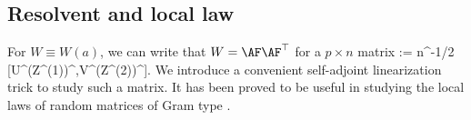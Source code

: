 \documentclass[aos,preprint]{imsart}
\begin{document}
\subsection{Resolvent and local law}\label{sec pf RMTlemma}


For $W\equiv W(a)$, we can write that $W=\AF\AF^{\top}$ for a $p\times n$ matrix
	\be\label{defn AF} \AF := n^{-1/2} [\Lambda U^\top (Z^{(1)})^\top,V^\top (Z^{(2)})^\top]. \ee
We introduce a convenient self-adjoint linearization trick to study such a matrix. It has been proved to be useful in studying the local laws of random matrices of Gram type \cite{Anisotropic, AEK_Gram, XYY_circular,yang2019spiked}. 
\end{document}
